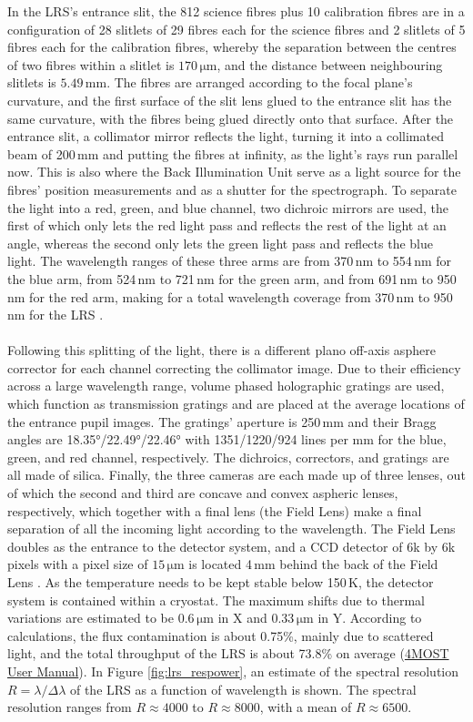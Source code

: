 \documentclass[a4paper,11pt]{article}
\begin{document}
In the LRS's entrance slit, the 812 science fibres plus 10 calibration fibres are in a configuration of 28 slitlets of 29 fibres each for the science fibres and 2 slitlets of 5 fibres each for the calibration fibres, whereby the separation between the centres of two fibres within a slitlet is $170\,\mathrm{\mu m}$, and the distance between neighbouring slitlets is $5.49\,\mathrm{mm}$. The fibres are arranged according to the focal plane's curvature, and the first surface of the slit lens glued to the entrance slit has the same curvature, with the fibres being glued directly onto that surface. After the entrance slit, a collimator mirror reflects the light, turning it into a collimated beam of 200\,mm and putting the fibres at infinity, as the light's rays run parallel now. This is also where the Back Illumination Unit serve as a light source for the fibres' position measurements and as a shutter for the spectrograph. To separate the light into a red, green, and blue channel, two dichroic mirrors are used, the first of which only lets the red light pass and reflects the rest of the light at an angle, whereas the second only lets the green light pass and reflects the blue light. The wavelength ranges of these three arms are from 370\,nm to 554\,nm for the blue arm, from 524\,nm to 721\,nm for the green arm, and from 691\,nm to 950\,nm for the red arm, making for a total wavelength coverage from 370\,nm to 950\,nm for the LRS \citep{laurent16}.\\ \\
%
Following this splitting of the light, there is a different plano off-axis asphere corrector for each channel correcting the collimator image. Due to their efficiency across a large wavelength range, volume phased holographic gratings are used, which function as transmission gratings and are placed at the average locations of the entrance pupil images. The gratings' aperture is 250\,mm and their Bragg angles are 18.35°/22.49°/22.46° with 1351/1220/924 lines per mm for the blue, green, and red channel, respectively. The dichroics, correctors, and gratings are all made of silica. Finally, the three cameras are each made up of three lenses, out of which the second and third are concave and convex aspheric lenses, respectively, which together with a final lens (the Field Lens) make a final separation of all the incoming light according to the wavelength. The Field Lens doubles as the entrance to the detector system, and a CCD detector of 6k by 6k pixels with a pixel size of $15\,\mathrm{\mu m}$ is located 4\,mm behind the back of the Field Lens \citep{laurent16}. As the temperature needs to be kept stable below 150\,K, the detector system is contained within a cryostat. The maximum shifts due to thermal variations are estimated to be $0.6\,\mathrm{\mu m}$ in X and $0.33\,\mathrm{\mu m}$ in Y. According to calculations, the flux contamination is about 0.75\%, mainly due to scattered light, and the total throughput of the LRS is about 73.8\% on average (\href{https://www.4most.eu/cms/files/VIS-MAN-4MOST-47110-9800-0001_2_00-4MOST-User-Manual.pdf}{4MOST User Manual}). In Figure \ref{fig:lrs_respower}, an estimate of the spectral resolution $R=\lambda/\Delta\lambda$ of the LRS as a function of wavelength is shown. The spectral resolution ranges from $R\approx4000$ to $R\approx8000$, with a mean of $R\approx6500$.
\end{document}
